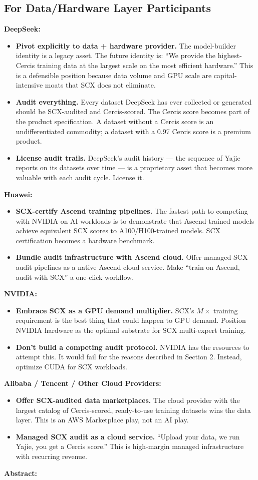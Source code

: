 \documentclass[12pt,a4paper]{article}
\theoremstyle{remark}
\begin{document}
\subsection{For Data/Hardware Layer Participants}
\textbf{DeepSeek:}
\begin{itemize}
 \item \textbf{Pivot explicitly to data + hardware provider.} The model-builder 
 identity is a legacy asset. The future identity is: ``We provide the 
 highest-Cercis training data at the largest scale on the most efficient 
 hardware.'' This is a defensible position because data volume and GPU 
 scale are capital-intensive moats that SCX does not eliminate.
 \item \textbf{Audit everything.} Every dataset DeepSeek has ever collected or 
 generated should be SCX-audited and Cercis-scored. The Cercis score 
 becomes part of the product specification. A dataset without a Cercis 
 score is an undifferentiated commodity; a dataset with a 0.97 Cercis 
 score is a premium product.
 \item \textbf{License audit trails.} DeepSeek's audit history --- the sequence of 
 Yajie reports on its datasets over time --- is a proprietary asset that 
 becomes more valuable with each audit cycle. License it.
\end{itemize}
\textbf{Huawei:}
\begin{itemize}
 \item \textbf{SCX-certify Ascend training pipelines.} The fastest path to 
 competing with NVIDIA on AI workloads is to demonstrate that Ascend-trained 
 models achieve equivalent SCX scores to A100/H100-trained models. SCX 
 certification becomes a hardware benchmark.
 \item \textbf{Bundle audit infrastructure with Ascend cloud.} Offer managed 
 SCX audit pipelines as a native Ascend cloud service. Make ``train on 
 Ascend, audit with SCX'' a one-click workflow.
\end{itemize}
\textbf{NVIDIA:}
\begin{itemize}
 \item \textbf{Embrace SCX as a GPU demand multiplier.} SCX's $M \times$ training 
 requirement is the best thing that could happen to GPU demand. Position 
 NVIDIA hardware as the optimal substrate for SCX multi-expert training.
 \item \textbf{Don't build a competing audit protocol.} NVIDIA has the resources 
 to attempt this. It would fail for the reasons described in Section 2. 
 Instead, optimize CUDA for SCX workloads.
\end{itemize}
\textbf{Alibaba / Tencent / Other Cloud Providers:}
\begin{itemize}
 \item \textbf{Offer SCX-audited data marketplaces.} The cloud provider with the 
 largest catalog of Cercis-scored, ready-to-use training datasets wins 
 the data layer. This is an AWS Marketplace play, not an AI play.
 \item \textbf{Managed SCX audit as a cloud service.} ``Upload your data, we run 
 Yajie, you get a Cercis score.'' This is high-margin managed infrastructure 
 with recurring revenue.
\end{itemize}
\noindent\textbf{Abstract: }
\end{document}
